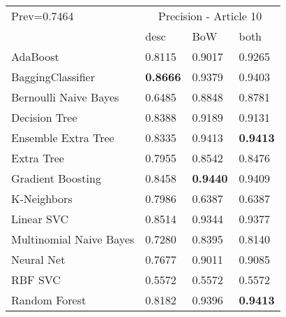 \begin{tabular}{|l|l|l|l| }
\hline
Prev=0.7464 &  \multicolumn{3}{c|}{Precision - Article 10} \\
\cline{2-4} & desc & BoW & both \\ \hline
AdaBoost                & 0.8115 & 0.9017 & 0.9265\\
BaggingClassifier       & {\bf 0.8666} & 0.9379 & 0.9403\\
Bernoulli Naive Bayes   & 0.6485 & 0.8848 & 0.8781\\
Decision Tree           & 0.8388 & 0.9189 & 0.9131\\
Ensemble Extra Tree     & 0.8335 & 0.9413 & {\bf 0.9413}\\
Extra Tree              & 0.7955 & 0.8542 & 0.8476\\
Gradient Boosting       & 0.8458 & {\bf 0.9440} & 0.9409\\
K-Neighbors             & 0.7986 & 0.6387 & 0.6387\\
Linear SVC              & 0.8514 & 0.9344 & 0.9377\\
Multinomial Naive Bayes & 0.7280 & 0.8395 & 0.8140\\
Neural Net              & 0.7677 & 0.9011 & 0.9085\\
RBF SVC                 & 0.5572 & 0.5572 & 0.5572\\
Random Forest           & 0.8182 & 0.9396 & {\bf 0.9413}\\
\hline
\end{tabular}